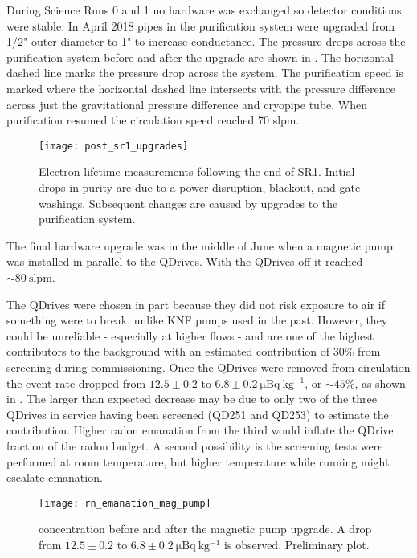 During Science Runs 0 and 1 no hardware was exchanged so detector conditions were stable.  In April 2018 pipes in the purification
system were upgraded from 1/2" outer diameter to 1" to increase conductance.  The pressure drops across the purification system before and
after the upgrade are shown in
.  The horizontal dashed line
marks the pressure drop across the system.  The purification speed is marked where the horizontal dashed line intersects with the
pressure difference across just the gravitational pressure difference and cryopipe tube.  When purification resumed the
circulation speed reached 70 slpm.

\begin{figure}
\centering
\texttt{[image: post\_sr1\_upgrades]}
\caption{Electron lifetime measurements following the end of SR1.  Initial drops in purity are due to a power disruption, blackout, and gate
washings.  Subsequent changes are caused by upgrades to the purification system.}
\label{fig:electron_lifetime_model_ops_post_sr1}
\end{figure}

The final hardware upgrade was in the middle of June when a magnetic pump was installed in parallel to the QDrives.  With the QDrives off
it reached ${\sim} 80\ \mathrm{slpm}$.

The QDrives were chosen in part because they did not risk exposure to air if something were to
break, unlike KNF pumps used in the past.  However, they could be unreliable - especially at higher flows - and
are one of the highest contributors to the 
background with an estimated contribution of 30\% from screening during commissioning.  Once the QDrives were removed from circulation the
 event rate dropped from $12.5 \pm 0.2$ to
$6.8 \pm 0.2\ \mathrm{\mu Bq\ kg^{-1}}$, or ${\sim} 45\%$, as shown in .  The larger
than expected decrease may be due to only two of the three QDrives in service having been screened (QD251 and QD253) to estimate the
contribution.  Higher radon emanation from the third would inflate
the QDrive fraction of the radon budget.  A second possibility is the screening tests were performed at room temperature, but higher
temperature while running might escalate emanation.

\begin{figure}
\centering
\texttt{[image: rn\_emanation\_mag\_pump]}
\caption{ concentration before and after the magnetic pump upgrade.  A drop from
$12.5 \pm 0.2$ to $6.8 \pm 0.2\ \mathrm{\mu Bq\ kg^{-1}}$ is observed.  Preliminary plot.}
\label{fig:electron_lifetime_model_ops_rn_emanation}
\end{figure}

